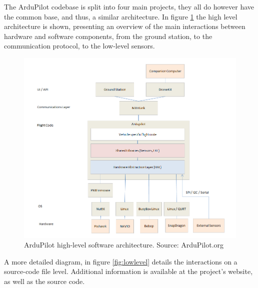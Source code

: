 The ArduPilot codebase is split into four main projects, they all do however have the common base, and thus, a similar architecture. In figure \ref{fig:highlevel} the high level architecture is shown, presenting an overview of the main interactions between hardware and software components, from the ground station, to the communication protocol, to the low-level sensors.

\begin{figure}[h]
\centering
  \includegraphics[width=0.95\linewidth]{figs/highlevelarch.png}
  \caption{ArduPilot high-level software architecture. Source: ArduPilot.org}
  \label{fig:highlevel}
\end{figure}

A more detailed diagram, in figure \ref{fig:lowlevel} details the interactions on a source-code file level. Additional information is available at the project's website, as well as the source code\cite{ardupilotcode}.


